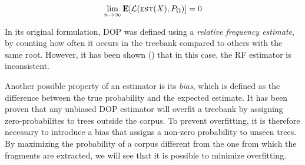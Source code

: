 $$\lim_{n \to \infty} \mathbf{E}[\mathcal{L}(\textsc{est}(X), P_\Omega)] = 0 $$


In its original formulation, DOP was defined using a \emph{relative frequency estimate}, by counting how often it occurs in the treebank compared to others with the same root. However, it has been shown () that in this case, the RF estimator is inconsistent.

Another possible property of an estimator is its \emph{bias}, which is defined as the difference between the true probability and the expected estimate. 
It has been proven that any unbiased DOP estimator will overfit a treebank by assigning zero-probabilites to trees outside the corpus.
To prevent overfitting, it is therefore necessary to introduce a bias that assigns a non-zero probability to unseen trees.
By maximizing the probability of a corpus different from the one from which the fragments are extracted, we will see that it is possible to minimize overfitting.




